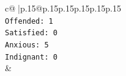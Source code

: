 \documentclass{article}
\begin{document}
{\begin{supertabular}{c@{$\;$}|p{.15\linewidth}@{}p{.15\linewidth}p{.15\linewidth}p{.15\linewidth}p{.15\linewidth}p{.15\linewidth}}
{{{\\ 
\texttt{Offended: 1} \\
\texttt{Satisfied: 0} \\
\texttt{Anxious: 5} \\
\texttt{Indignant: 0} \\
            }
        }
    }
    & \\ \\

\end{supertabular}
}
\end{document}
